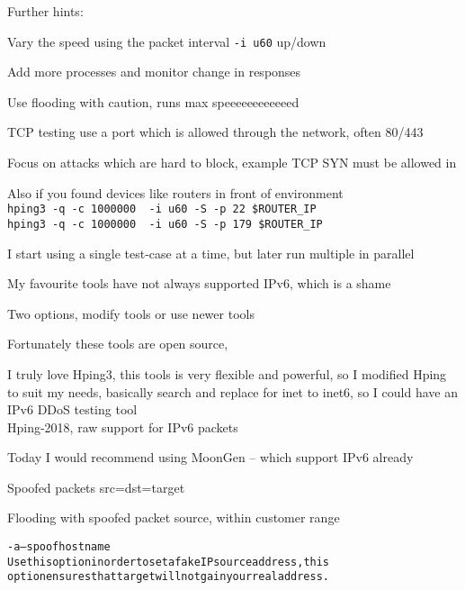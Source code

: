 \documentclass[Screen16to9,17pt]{foils}
\begin{document}


Further hints:
\begin{list2}
\item Vary the speed using the packet interval \verb+-i u60+ up/down
\item Add more processes and monitor change in responses
\item Use flooding with caution, runs max speeeeeeeeeeeed \smiley
\item TCP testing use a port which is allowed through the network, often 80/443
\item Focus on attacks which are hard to block, example TCP SYN must be allowed in
\item Also if you found devices like routers in front of environment\\
\verb+hping3 -q -c 1000000  -i u60 -S -p 22 $ROUTER_IP+\\
\verb+hping3 -q -c 1000000  -i u60 -S -p 179 $ROUTER_IP+
\end{list2}

I start using a single test-case at a time, but later run multiple in parallel


My favourite tools have not always supported IPv6, which is a shame

Two options, modify tools or use newer tools

\begin{list2}
\item Fortunately these tools are open source,

\item I truly love Hping3, this tools is very flexible and powerful, so I modified Hping to suit my needs, basically search and replace for inet to inet6, so I could have an IPv6 DDoS testing tool\\
 Hping-2018, raw support for IPv6 packets
\item Today I would recommend using MoonGen -- which support IPv6 already\\
\end{list2}



Spoofed packets src=dst=target \smiley

Flooding with spoofed packet source, within customer range

\begin{alltt}\small

-a --spoof hostname
    Use this option in order to set a fake IP  source  address,  this
    option ensures that target will not gain your real address.
\end{alltt}
\end{document}
